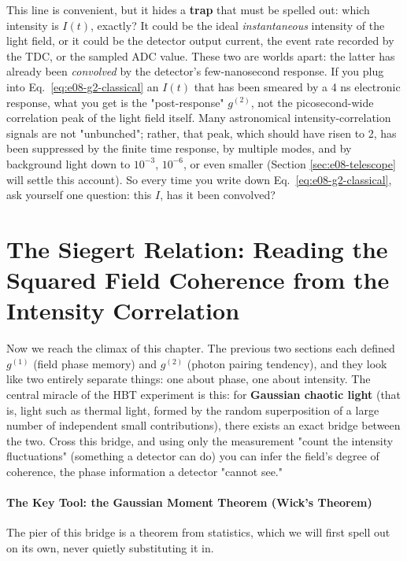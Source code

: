 This line is convenient, but it hides a \textbf{trap} that must be spelled out: which intensity is \(I(t)\), exactly? It could be the ideal \emph{instantaneous} intensity of the light field, or it could be the detector output current, the event rate recorded by the TDC, or the sampled ADC value. These two are worlds apart: the latter has already been \emph{convolved} by the detector's few-nanosecond response. If you plug into Eq.~\eqref{eq:e08-g2-classical} an \(I(t)\) that has been smeared by a 4 ns electronic response, what you get is the "post-response" \(g^{(2)}\), not the picosecond-wide correlation peak of the light field itself. Many astronomical intensity-correlation signals are not "unbunched"; rather, that peak, which should have risen to 2, has been suppressed by the finite time response, by multiple modes, and by background light down to \(10^{-3}\), \(10^{-6}\), or even smaller (Section \ref{sec:e08-telescope} will settle this account). So every time you write down Eq.~\eqref{eq:e08-g2-classical}, ask yourself one question: this \(I\), has it been convolved?

\section{The Siegert Relation: Reading the Squared Field Coherence from the Intensity Correlation}
\label{sec:e08-siegert}

Now we reach the climax of this chapter. The previous two sections each defined \(g^{(1)}\) (field phase memory) and \(g^{(2)}\) (photon pairing tendency), and they look like two entirely separate things: one about phase, one about intensity. The central miracle of the HBT experiment is this: for \textbf{Gaussian chaotic light} (that is, light such as thermal light, formed by the random superposition of a large number of independent small contributions), there exists an exact bridge between the two. Cross this bridge, and using only the measurement "count the intensity fluctuations" (something a detector can do) you can infer the field's degree of coherence, the phase information a detector "cannot see."

\paragraph{The Key Tool: the Gaussian Moment Theorem (Wick's Theorem)}
\label{sec:e08-gaussian-moment}

The pier of this bridge is a theorem from statistics, which we will first spell out on its own, never quietly substituting it in.

